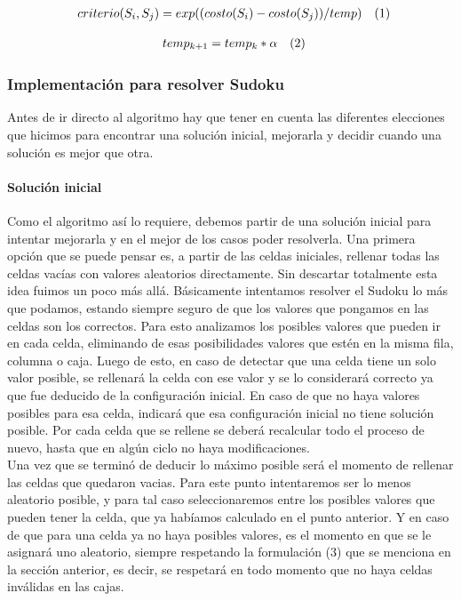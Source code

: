 \begin{equation*}
\begin{array}{ll@{}ll}
criterio(S_{i}, S_{j})= exp( (costo(S_{i}) - costo(S_{j})) / temp) & (1) 
\end{array}
\end{equation*}

\begin{equation*}
\begin{array}{ll@{}ll}
temp_{k+1} =  temp_{k} *  \alpha & (2)
\end{array}
\end{equation*}


\subsubsection{Implementación para resolver Sudoku}
Antes de ir directo al algoritmo hay que tener en cuenta las diferentes elecciones que hicimos para encontrar una solución inicial, mejorarla y  decidir cuando una solución es mejor que otra.
\paragraph{Solución inicial} 
Como el algoritmo así lo requiere, debemos partir de una solución inicial para intentar mejorarla y en el mejor de los casos poder resolverla. Una primera opción que se puede pensar es, a partir de las celdas iniciales, rellenar todas las celdas vacías con valores aleatorios directamente. Sin descartar totalmente esta idea fuimos un poco más allá. Básicamente intentamos resolver el Sudoku lo más que podamos, estando siempre seguro de que los valores que pongamos en las celdas son los correctos. Para esto analizamos los posibles valores que pueden ir en cada celda, eliminando de esas posibilidades valores que estén en la misma fila, columna o caja. Luego de esto, en caso de detectar que una celda tiene un solo valor posible, se rellenará la celda con ese valor y se lo considerará correcto ya que fue deducido de la configuración inicial. En caso de que no haya valores posibles para esa celda, indicará que esa configuración inicial no tiene solución posible. Por cada celda que se rellene se deberá recalcular todo el proceso de nuevo, hasta que en algún ciclo no haya modificaciones. \\Una vez que se terminó de deducir lo máximo posible será el momento de rellenar las celdas que quedaron vacias. Para este punto intentaremos ser lo menos aleatorio posible, y para tal caso seleccionaremos entre los posibles valores que pueden tener la celda, que ya habíamos calculado en el punto anterior. Y en caso de que para una celda ya no haya posibles valores, es el momento en que se le asignará uno aleatorio, siempre respetando la formulación (3) que se menciona en la sección anterior, es decir, se respetará en todo momento que no haya celdas inválidas en las cajas.

